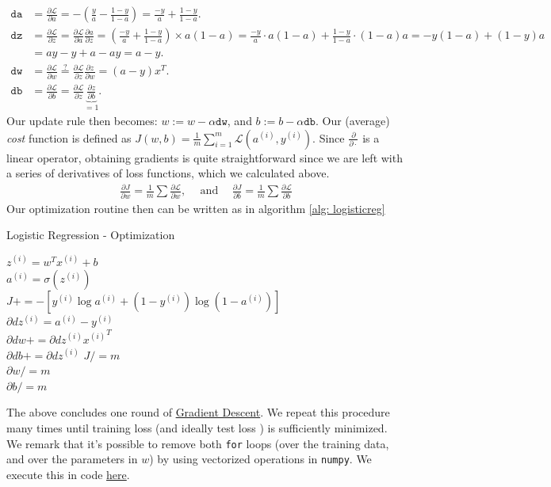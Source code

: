 \documentclass[12pt]{article}
\begin{document}
{
\small{
\begin{align*}
\texttt{da} &= \frac{\partial \mathcal L}{\partial a} = - \left(\frac{y}{a} - \frac{1-y}{1-a}\right) = \frac{-y}{a} + \frac{1-y}{1-a}. \\
  \texttt{dz} &= \frac{\partial \mathcal L}{\partial z} = \frac{\partial \mathcal L}{\partial a}\frac{\partial a}{\partial z} = \left(\frac{-y}{a} + \frac{1-y}{1-a}\right) \times a(1-a) = \frac{-y}{a} \cdot a(1-a) + \frac{1-y}{1-a} \cdot (1-a) a = -y(1-a)+ (1-y)a \\ &= ay - y + a - ay = a - y.  \\
\texttt{dw} &= \frac{\partial \mathcal L}{\partial w} \overset{?}{=} \frac{\partial \mathcal L}{\partial z} \frac{\partial z}{\partial w} = (a-y) x^T. \\
\texttt{db} &= \frac{\partial \mathcal L}{\partial b} = \frac{\partial \mathcal L}{\partial z} \underbrace{\frac{\partial z}{\partial b}}_{=1}. \end{align*}
}
}
Our update rule then becomes: $w := w - \alpha \texttt{dw}$, and $b := b - \alpha \texttt{db}$. Our (average) \emph{cost} function is defined as $J(w,b) = \frac{1}{m} \sum_{i=1}^m \mathcal L(a^{(i)}, y^{(i)})$. Since $\frac{\partial}{\partial \cdot}$ is a linear operator, obtaining gradients is quite straightforward since we are left with a series of derivatives of loss functions, which we calculated above.
\begin{align*}    \frac{\partial J}{\partial w} = \frac{1}{m} \sum \frac{\partial \mathcal L}{\partial w}, \hspace{15pt} \textrm{and} \hspace{15pt} \frac{\partial J}{\partial b} = \frac{1}{m} \sum \frac{\partial \mathcal L}{\partial b} \end{align*}
Our optimization routine then can be written as in algorithm \ref{alg: logisticreg}

{\small
\begin{algorithm}[H]
  \label{alg: logisticreg}
  \caption{Logistic Regression - Optimization}    {
    $z^{(i)} = w^Tx^{(i)} + b$ \\
    $a^{(i)} = \sigma(z^{(i)})$ \\
    $J += - \left[ y^{(i)} \log a^{(i)} + (1-y^{(i)}) \log (1 - a^{(i)}) \right]$ \\
    $\partial d z^{(i)} = a^{(i)} - y^{(i)}$ \\
    $\partial d w += \partial d z^{(i)} {x^{(i)}}^T$ \\
    $\partial d b += \partial d z^{(i)}$
}
$J /= m$ \\
$\partial w /= m$ \\
$\partial b /= m$ \end{algorithm}
}
The above concludes one round of \href{https://en.wikipedia.org/wiki/Gradient_descent}{Gradient Descent}. We repeat this procedure many times until training loss (and ideally test loss ) is sufficiently minimized. We remark that it's possible to remove both \texttt{for} loops (over the training data, and over the parameters in $w$) by using vectorized operations in \texttt{numpy}. We execute this in code \href{https://github.com/asantucci/NN/blob/master/logistic_regression.py#L46}{here}.
\end{document}
